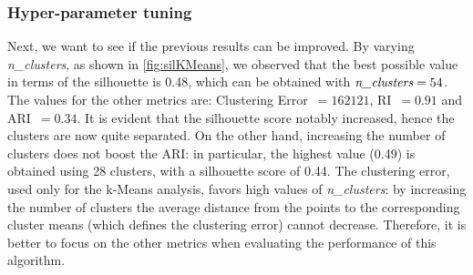 \documentclass[acmlarge,nonacm]{acmart}
\begin{document}
\subsubsection{Hyper-parameter tuning}
Next, we want to see if the previous results can be improved. By varying \emph{n\_clusters}, as shown in \cref{fig:silKMeans}, we observed that the best possible value in terms of the silhouette is 0.48, which can be obtained with $\emph{n\_clusters}=54$. The values for the other metrics are: Clustering Error~$=162121$, RI~$=0.91$ and ARI~$=0.34$. It is evident that the silhouette score notably increased, hence the clusters are now quite separated. On the other hand, increasing the number of clusters does not boost the ARI: in particular, the highest value (0.49) is obtained using 28 clusters, with a silhouette score of 0.44. The clustering error, used only for the k-Means analysis, favors high values of \emph{n\_clusters}: by increasing the number of clusters the average distance from the points to the corresponding cluster means (which defines the clustering error) cannot decrease. Therefore, it is better to focus on the other metrics when evaluating the performance of this algorithm. 
\end{document}
